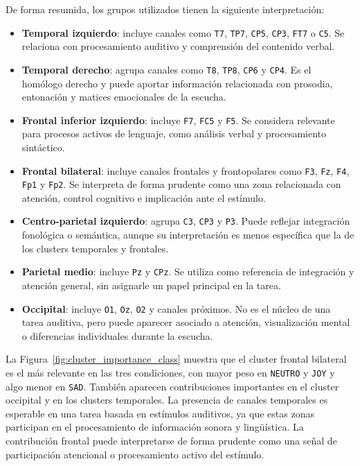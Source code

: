 De forma resumida, los grupos utilizados tienen la siguiente interpretación:

\begin{itemize}
    \item \textbf{Temporal izquierdo}: incluye canales como \texttt{T7}, \texttt{TP7}, \texttt{CP5}, \texttt{CP3}, \texttt{FT7} o \texttt{C5}. Se relaciona con procesamiento auditivo y comprensión del contenido verbal.
    \item \textbf{Temporal derecho}: agrupa canales como \texttt{T8}, \texttt{TP8}, \texttt{CP6} y \texttt{CP4}. Es el homólogo derecho y puede aportar información relacionada con prosodia, entonación y matices emocionales de la escucha.
    \item \textbf{Frontal inferior izquierdo}: incluye \texttt{F7}, \texttt{FC5} y \texttt{F5}. Se considera relevante para procesos activos de lenguaje, como análisis verbal y procesamiento sintáctico.
    \item \textbf{Frontal bilateral}: incluye canales frontales y frontopolares como \texttt{F3}, \texttt{Fz}, \texttt{F4}, \texttt{Fp1} y \texttt{Fp2}. Se interpreta de forma prudente como una zona relacionada con atención, control cognitivo e implicación ante el estímulo.
    \item \textbf{Centro-parietal izquierdo}: agrupa \texttt{C3}, \texttt{CP3} y \texttt{P3}. Puede reflejar integración fonológica o semántica, aunque su interpretación es menos específica que la de los clusters temporales y frontales.
    \item \textbf{Parietal medio}: incluye \texttt{Pz} y \texttt{CPz}. Se utiliza como referencia de integración y atención general, sin asignarle un papel principal en la tarea.
    \item \textbf{Occipital}: incluye \texttt{O1}, \texttt{Oz}, \texttt{O2} y canales próximos. No es el núcleo de una tarea auditiva, pero puede aparecer asociado a atención, visualización mental o diferencias individuales durante la escucha.
\end{itemize}

La Figura~\ref{fig:cluster_importance_class} muestra que el cluster frontal bilateral es el más relevante en las tres condiciones, con mayor peso en \texttt{NEUTRO} y \texttt{JOY} y algo menor en \texttt{SAD}. También aparecen contribuciones importantes en el cluster occipital y en los clusters temporales. La presencia de canales temporales es esperable en una tarea basada en estímulos auditivos, ya que estas zonas participan en el procesamiento de información sonora y lingüística. La contribución frontal puede interpretarse de forma prudente como una señal de participación atencional o procesamiento activo del estímulo.

